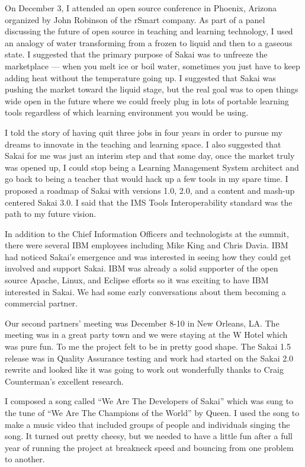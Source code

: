 \documentclass[12pt]{book}
\begin{document}
On December 3, I attended an open source
conference in Phoenix, Arizona
organized by John Robinson of the rSmart
company.  As part of a panel
discussing the future of open source in
teaching and learning technology,
I used an analogy of water
transforming from a frozen to liquid and then to
a gaseous state.  I suggested that the primary
purpose of Sakai was to unfreeze the
marketplace --- when you melt ice or boil water,
sometimes you just have to
keep adding heat without the temperature going up.
I suggested that Sakai was pushing the market toward
the liquid stage, but the real goal was to
open things wide open in the future where we
could freely plug in lots of portable learning
tools regardless of which learning environment
you would be using.

I told the story of having quit three jobs in
four years in order to pursue my dreams to
innovate in the teaching and learning space.
I also suggested that Sakai for me was just
an interim step and that some day, once the
market truly was opened up, I could stop being
a Learning Management System architect and go back
to being a teacher that would hack up a
few tools in my spare time.  I proposed a
roadmap of Sakai with versions 1.0, 2.0, and
a content and mash-up centered Sakai 3.0.
I said that the IMS Tools Interoperability
standard was the path to my future vision.

In addition to the Chief Information Officers and
technologists at the summit, there were several
IBM employees including Mike King and
Chris Davia.  IBM had noticed Sakai's emergence
and was interested in seeing how they could
get involved and support Sakai.  IBM was
already a solid supporter of the open source
Apache, Linux, and Eclipse efforts so it was
exciting to have IBM interested in Sakai.
We had some early conversations about them
becoming a commercial partner.

Our second partners' meeting was December
8-10 in New Orleans, LA.  The meeting was
in a great party town and we were staying
at the W Hotel which was pure fun.  To
me the project felt to be in pretty
good shape.   The Sakai 1.5 release was in
Quality Assurance testing and work had started
on the Sakai 2.0 rewrite and looked like
it was going to work out wonderfully thanks
to Craig Counterman's excellent research.

I composed a song called ``We Are The
Developers of Sakai'' which was sung to the
tune of ``We Are The Champions of the World''
by Queen.  I used the song to make a music video
that included groups of people and individuals
singing the song.  It turned out pretty
cheesy, but we needed to have a little fun
after a full year of running the project at
breakneck speed and bouncing from one problem
to another.
\end{document}
